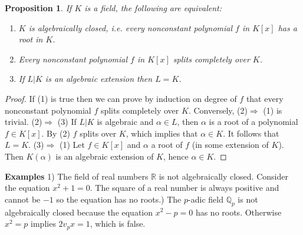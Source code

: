 \documentclass[12pt]{article}
\newtheorem{proposition}{Proposition}
\begin{document}
\begin{proposition} If $K$ is a field, the following are equivalent:\\
\begin{enumerate}
\item[(1)] $K$ is algebraically closed, i.e. every nonconstant polynomial $f$ in $K[x]$ has a root in $K$.
\item[(2)] Every nonconstant polynomial $f$ in $K[x]$ splits completely over $K$.
\item[(3)] If $L|K$ is an algebraic extension then $L = K$.\end{enumerate}\end{proposition}
\begin{proof}
 If (1) is true then we can prove by induction on degree of $f$ that every nonconstant polynomial $f$ splits completely over $K$. Conversely, (2)$\Rightarrow$ (1) is trivial.\newline
(2)$\Rightarrow$ (3) If $L|K$ is algebraic and $\alpha\in L$, then $\alpha$ is a root of a polynomial $f\in K[x]$. By (2) $f$ splits over $K$, which implies that $\alpha\in K$. It follows that $L=K$.\newline
(3)$\Rightarrow$ (1) Let $f\in K[x]$ and $\alpha$ a root of $f$ (in some extension of $K$). Then $K(\alpha)$ is an algebraic extension of $K$, hence  $\alpha\in K$.
\end{proof} 
\textbf{Examples} 1) The field of real numbers $\mathbb{R}$ is not algebraically closed. Consider the equation $x^2+1=0$. The square of a real number is always positive and cannot be $-1$ so the equation has no roots.) The $p$-adic field $\mathbb{Q}_p$ is not algebraically closed because the equation $x^2-p=0$ has no roots. Otherwise $x^2=p$ implies $2v_{p}x = 1$, which is false.

\end{document}
